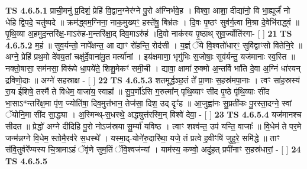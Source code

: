 \documentclass[17pt]{extarticle}
\begin{document}
                                        \textbf{ TS 4.6.5.1} \newline
                  प्राची॒मनु॑ प्र॒दिशं॒ प्रेहि॑ वि॒द्वान॒ग्नेर॑ग्ने पु॒रो अ॑ग्निर्भवे॒ह । विश्वा॒ आशा॒ दीद्या॑नो॒ वि भा॒ह्यूर्जं॑ नो धेहि द्वि॒पदे॒ चतु॑ष्पदे ॥ क्रम॑द्ध्वम॒ग्निना॒ नाक॒मुख्यꣳ॒॒ हस्ते॑षु॒ बिभ्र॑तः । दि॒वः पृ॒ष्ठꣳ सुव॑र्ग॒त्वा मि॒श्रा दे॒वेभि॑राद्ध्वं ॥ पृ॒थि॒व्या अ॒हमुद॒न्तरि॑क्ष॒-माऽरु॑ह-म॒न्तरि॑क्षा॒द् दिव॒माऽरु॑हं ।दि॒वो नाक॑स्य पृ॒ष्ठाथ् सुव॒र्ज्योति॑रगा- [  ] \textbf{  21} \newline
                  \newline
                                \textbf{ TS 4.6.5.2} \newline
                  म॒हं ॥ सुव॒र्यन्तो॒ नापे᳚क्षन्त॒ आ द्याꣳ रो॑हन्ति॒ रोद॑सी । य॒ज्ञ्ं ॅये वि॒श्वतो॑धारꣳ॒॒ सुवि॑द्वाꣳसो वितेनि॒रे ॥ अग्ने॒ प्रेहि॑ प्रथ॒मो दे॑वय॒तां चक्षु॑र्दे॒वाना॑मु॒त मर्त्या॑नां । इय॑क्षमाणा॒ भृगु॑भिः स॒जोषाः॒ सुव॑र्यन्तु॒ यज॑मानाः स्व॒स्ति ॥ नक्तो॒षासा॒ सम॑नसा॒ विरू॑पे धा॒पये॑ते॒ शिशु॒मेकꣳ॑ समी॒ची । द्यावा॒ क्षामा॑ रु॒क्मो अ॒न्तर्वि भा॑ति दे॒वा अ॒ग्निं धा॑रयन् द्रविणो॒दाः ॥ अग्ने॑ सहस्राक्ष - [  ] \textbf{  22} \newline
                  \newline
                                \textbf{ TS 4.6.5.3} \newline
                  शतमूर्द्धञ्छ॒तं ते᳚ प्रा॒णाः स॒हस्र॑मपा॒नाः । त्वꣳ सा॑ह॒स्रस्य॑ रा॒य ई॑शिषे॒ तस्मै॑ ते विधेम॒ वाजा॑य॒ स्वाहा᳚ ॥ सु॒प॒र्णो॑ऽसि ग॒रुत्मा᳚न् पृथि॒व्याꣳ सी॑द पृ॒ष्ठे पृ॑थि॒व्याः सी॑द भा॒साऽ*न्तरि॑क्ष॒मा पृ॑ण॒ ज्योति॑षा॒ दिव॒मुत्त॑भान॒ तेज॑सा॒ दिश॒ उद् दृꣳ॑ह ॥ आ॒जुह्वा॑नः सु॒प्रती॑कः पु॒रस्ता॒दग्ने॒ स्वां ॅयोनि॒मा सी॑द सा॒द्ध्या । अ॒स्मिन्थ्-स॒धस्थे॒ अद्ध्युत्त॑रस्मि॒न् विश्वे॑ देवा॒ - [  ] \textbf{  23} \newline
                  \newline
                                \textbf{ TS 4.6.5.4} \newline
                  यज॑मानश्च सीदत ॥ प्रेद्धो॑ अग्ने दीदिहि पु॒रो नोऽज॑स्रया सू॒र्म्या॑ यविष्ठ । त्वाꣳ शश्व॑न्त॒ उप॑ यन्ति॒ वाजाः᳚ ॥ वि॒धेम॑ ते पर॒मे जन्म॑न्नग्ने वि॒धेम॒ स्तोमै॒रव॑रे स॒धस्थे᳚ । यस्मा॒द्-योने॑रु॒दारि॑था॒ यजे॒ तं प्रत्वे ह॒वीꣳषि॑ जुहुरे॒ समि॑द्धे ॥ ताꣳ स॑वि॒तुर्वरे᳚ण्यस्य चि॒त्रामाऽहं ॅवृ॑णे सुम॒तिं ॅवि॒श्वज॑न्यां । याम॑स्य॒ कण्वो॒ अदु॑ह॒त् प्रपी॑नाꣳ स॒हस्र॑धारां॒ - [  ] \textbf{  24} \newline
                  \newline
                                \textbf{ TS 4.6.5.5} \newline
\end{document}
